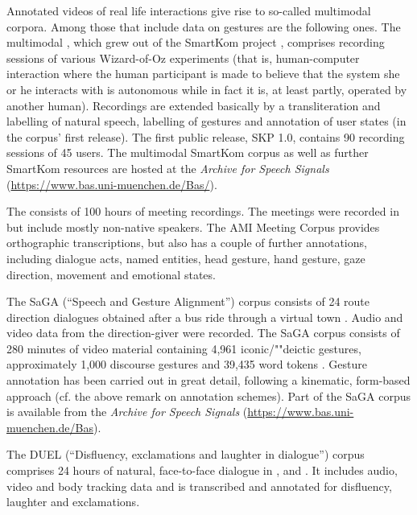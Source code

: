 \documentclass[output=paper
 	        ,biblatex
                ,babelshorthands
                ,newtxmath
                ,draftmode
                ,colorlinks, citecolor=brown
]{langscibook}
\begin{document}
Annotated videos of real life interactions give rise to so-called multimodal corpora. 
%
Among those that include data on gestures are the following ones.
%
The multimodal  \citep{Schiel:Steininger:Tuerk:2003}, which grew out of the SmartKom project \citep{Wahlster:2006}, comprises recording sessions of various Wizard-of-Oz experiments (that is, human-computer interaction where the human participant is made to believe that the system she or he interacts with is autonomous while in fact it is, at least partly, operated by another human).
%
Recordings are extended basically by a transliteration and labelling of natural speech, labelling of gestures and annotation of user states (in the corpus' first release). 
%
The first public release, SKP 1.0, contains 90 recording sessions of 45 users. 
%
The multimodal SmartKom corpus as well as further SmartKom resources are hosted at the \textit{ Archive for Speech Signals} (\url{https://www.bas.uni-muenchen.de/Bas/}).


The  \citep{Carletta:et:al:2006} consists of 100 hours of meeting recordings.
%
The meetings were recorded in  but include mostly non-native speakers. 
%
The AMI Meeting Corpus provides orthographic transcriptions, but also has a couple of further annotations, including dialogue acts, named entities, head gesture, hand gesture, gaze direction, movement and emotional states.


The SaGA (\enquote{Speech and Gesture Alignment}) corpus consists of 24  route direction dialogues obtained after a bus ride through a virtual town \citep{Luecking:Bergmann:Hahn:Kopp:Rieser:2010}. 
%
Audio and video data from the direction-giver were recorded. 
%
The SaGA corpus consists of 280 minutes of video material containing 4,961 iconic/""deictic gestures, approximately 1,000 discourse gestures and 39,435 word tokens \citep{Luecking:Bergmann:Hahn:Kopp:Rieser:2013}.
%
Gesture annotation has been carried out in great detail, following a kinematic, form-based approach (cf. the above remark on annotation schemes).
%
Part of the SaGA corpus is available from the \textit{ Archive for Speech Signals} (\url{https://www.bas.uni-muenchen.de/Bas}).


The DUEL (\enquote{Disfluency, exclamations and laughter in dialogue}) corpus \citep{Hough:Tian:de:Ruiter:Betz:Kousidis:Schlangen:Ginzburg:2016} comprises 24 hours of natural, face-to-face dialogue in ,  and .
%
It includes audio, video and body tracking data and is transcribed and annotated for disfluency, laughter and exclamations.
\end{document}

